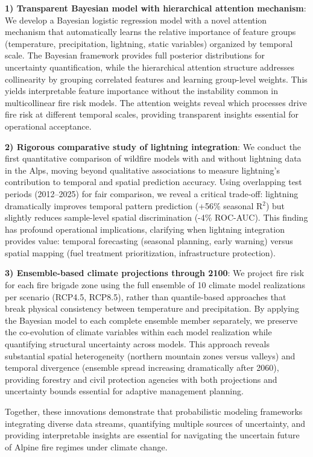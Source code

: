 \documentclass[11pt,a4paper]{article}
\begin{document}
\textbf{1) Transparent Bayesian model with hierarchical attention mechanism}: We develop a Bayesian logistic regression model with a novel attention mechanism that automatically learns the relative importance of feature groups (temperature, precipitation, lightning, static variables) organized by temporal scale. The Bayesian framework provides full posterior distributions for uncertainty quantification, while the hierarchical attention structure addresses collinearity by grouping correlated features and learning group-level weights. This yields interpretable feature importance without the instability common in multicollinear fire risk models. The attention weights reveal which processes drive fire risk at different temporal scales, providing transparent insights essential for operational acceptance.

\textbf{2) Rigorous comparative study of lightning integration}: We conduct the first quantitative comparison of wildfire models with and without lightning data in the Alps, moving beyond qualitative associations to measure lightning's contribution to temporal and spatial prediction accuracy. Using overlapping test periods (2012--2025) for fair comparison, we reveal a critical trade-off: lightning dramatically improves temporal pattern prediction (+56\% seasonal R$^2$) but slightly reduces sample-level spatial discrimination (-4\% ROC-AUC). This finding has profound operational implications, clarifying when lightning integration provides value: temporal forecasting (seasonal planning, early warning) versus spatial mapping (fuel treatment prioritization, infrastructure protection).

\textbf{3) Ensemble-based climate projections through 2100}: We project fire risk for each fire brigade zone using the full ensemble of 10 climate model realizations per scenario (RCP4.5, RCP8.5), rather than quantile-based approaches that break physical consistency between temperature and precipitation. By applying the Bayesian model to each complete ensemble member separately, we preserve the co-evolution of climate variables within each model realization while quantifying structural uncertainty across models. This approach reveals substantial spatial heterogeneity (northern mountain zones versus valleys) and temporal divergence (ensemble spread increasing dramatically after 2060), providing forestry and civil protection agencies with both projections and uncertainty bounds essential for adaptive management planning.

Together, these innovations demonstrate that probabilistic modeling frameworks integrating diverse data streams, quantifying multiple sources of uncertainty, and providing interpretable insights are essential for navigating the uncertain future of Alpine fire regimes under climate change.
\end{document}
